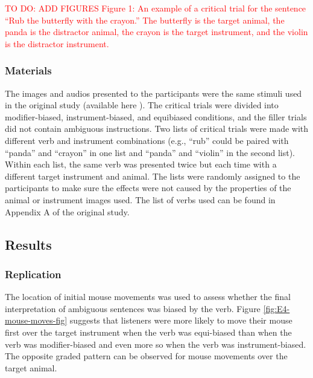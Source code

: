 \documentclass[
  man,floatsintext]{apa6}
\begin{document}
\textcolor{red}{TO DO: ADD FIGURES Figure 1: An example of a critical trial for the sentence “Rub the butterfly with the crayon.” The butterfly is the target animal, the panda is the distractor animal, the crayon is the target instrument, and the violin is the distractor instrument.}

\hypertarget{materials-1}{%
\subsubsection{Materials}\label{materials-1}}

The images and audios presented to the participants were the same stimuli used in the original study (available here ). The critical trials were divided into modifier-biased, instrument-biased, and equibiased conditions, and the filler trials did not contain ambiguous instructions. Two lists of critical trials were made with different verb and instrument combinations (e.g., ``rub'' could be paired with ``panda'' and ``crayon'' in one list and ``panda'' and ``violin'' in the second list). Within each list, the same verb was presented twice but each time with a different target instrument and animal. The lists were randomly assigned to the participants to make sure the effects were not caused by the properties of the animal or instrument images used. The list of verbs used can be found in Appendix A of the original study.

\hypertarget{results-3}{%
\subsection{Results}\label{results-3}}

\hypertarget{replication-2}{%
\subsubsection{Replication}\label{replication-2}}

The location of initial mouse movements was used to assess whether the final interpretation of ambiguous sentences was biased by the verb. Figure \ref{fig:E4-mouse-moves-fig} suggests that listeners were more likely to move their mouse first over the target instrument when the verb was equi-biased than when the verb was modifier-biased and even more so when the verb was instrument-biased. The opposite graded pattern can be observed for mouse movements over the target animal.
\end{document}
